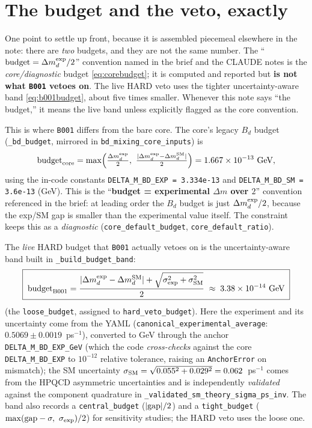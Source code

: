\documentclass[11pt]{article}
\newcommand{\dmd}{\Delta m_d}
\newcommand{\code}[1]{\texttt{#1}}
\theoremstyle{definition}
\begin{document}
\section{The budget and the veto, exactly}
\label{sec:budget}

One point to settle up front, because it is assembled piecemeal elsewhere in the
note: there are \emph{two} budgets, and they are not the same number. The
``$\text{budget}=\dmd^{\rm exp}/2$'' convention named in the brief and the CLAUDE
notes is the \emph{core/diagnostic} budget \eqref{eq:corebudget}; it is computed
and reported but \textbf{is not what \code{B001} vetoes on}. The live HARD veto
uses the tighter uncertainty-aware band \eqref{eq:b001budget}, about five times
smaller. Whenever this note says ``the budget,'' it means the live band unless
explicitly flagged as the core convention.

This is where \code{B001} differs from the bare core. The core's legacy $B_d$
budget (\code{\_bd\_budget}, mirrored in \code{bd\_mixing\_core\_inputs}) is
\begin{equation}
\text{budget}_{\rm core}
   = \max\!\Big(\tfrac{\dmd^{\rm exp}}{2},\ \tfrac{|\dmd^{\rm exp}-\dmd^{\rm SM}|}{2}\Big)
   = 1.667\times10^{-13}~\text{GeV},
\label{eq:corebudget}
\end{equation}
using the in-code constants \code{DELTA\_M\_BD\_EXP = 3.334e-13} and
\code{DELTA\_M\_BD\_SM = 3.6e-13} (GeV). This is the ``\textbf{budget = experimental
$\Delta m$ over $2$}'' convention referenced in the brief: at leading order the
$B_d$ budget is just $\dmd^{\rm exp}/2$, because the exp/SM gap is smaller than the
experimental value itself. The constraint keeps this as a \emph{diagnostic}
(\code{core\_default\_budget}, \code{core\_default\_ratio}).

The \emph{live} HARD budget that \code{B001} actually vetoes on is the
uncertainty-aware band built in \code{\_build\_budget\_band}:
\begin{equation}
\boxed{\;\text{budget}_{\rm B001}
   = \frac{|\dmd^{\rm exp}-\dmd^{\rm SM}| + \sqrt{\sigma_{\rm exp}^2+\sigma_{\rm SM}^2}}{2}
   \;\approx\; 3.38\times10^{-14}~\text{GeV}\;}
\label{eq:b001budget}
\end{equation}
(the \code{loose\_budget}, assigned to \code{hard\_veto\_budget}). Here the
experiment and its uncertainty come from the YAML
(\code{canonical\_experimental\_average}: $0.5069\pm0.0019$~ps$^{-1}$), converted
to GeV through the anchor \code{DELTA\_M\_BD\_EXP\_GeV} (which the code
\emph{cross-checks} against the core \code{DELTA\_M\_BD\_EXP} to
$10^{-12}$ relative tolerance, raising an \code{AnchorError} on mismatch); the SM
uncertainty $\sigma_{\rm SM}=\sqrt{0.055^2+0.029^2}=0.062$~ps$^{-1}$ comes from the
HPQCD asymmetric uncertainties and is independently \emph{validated} against the
component quadrature in \code{\_validated\_sm\_theory\_sigma\_ps\_inv}. The band
also records a \code{central\_budget} ($|{\rm gap}|/2$) and a \code{tight\_budget}
($\max({\rm gap}-\sigma,\ \sigma_{\rm exp})/2$) for sensitivity studies; the HARD
veto uses the loose one.
\end{document}

